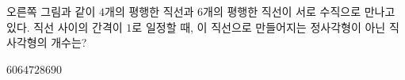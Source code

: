 \hspace*{2mm}\begin{minipage}[t]{\dimexpr\linewidth-2mm\relax}\vspace{0pt}
\noindent\begin{minipage}[t]{0.58\linewidth}\vspace{0pt}\raggedright 오른쪽 그림과 같이 $4$개의 평행한 직선과 $6$개의 평행한 직선이 서로 수직으로 만나고 있다. 직선 사이의 간격이 $1$로 일정할 때, 이 직선으로 만들어지는 정사각형이 아닌 직사각형의 개수는?\end{minipage}\hfill\begin{minipage}[t]{0.4\linewidth}\vspace{0pt}\centering \resizebox{\ifdim\width>\linewidth\linewidth\else\width\fi}{!}{}\end{minipage}\par
\begin{choices32}{$60$}{$64$}{$72$}{$86$}{$90$}\end{choices32}\end{minipage}
